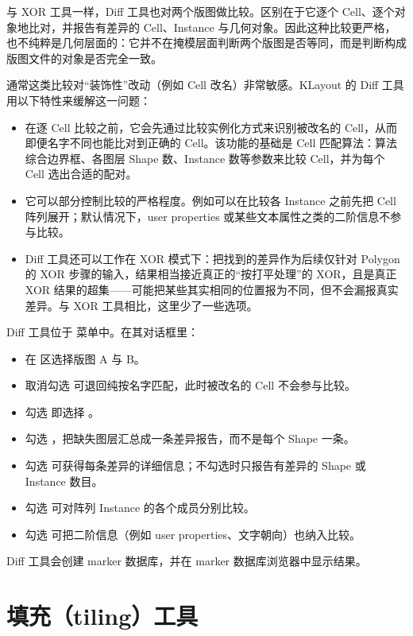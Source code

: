 与 XOR 工具一样，Diff 工具也对两个版图做比较。区别在于它逐个 Cell、逐个对象地比对，并报告有差异的 Cell、Instance 与几何对象。因此这种比较更严格，也不纯粹是几何层面的：它并不在掩模层面判断两个版图是否等同，而是判断构成版图文件的对象是否完全一致。

通常这类比较对“装饰性”改动（例如 Cell 改名）非常敏感。KLayout 的 Diff 工具用以下特性来缓解这一问题：

\begin{itemize}
\item 在逐 Cell 比较之前，它会先通过比较实例化方式来识别被改名的 Cell，从而即便名字不同也能比对到正确的 Cell。该功能的基础是 Cell 匹配算法：算法综合边界框、各图层 Shape 数、Instance 数等参数来比较 Cell，并为每个 Cell 选出合适的配对。
\item 它可以部分控制比较的严格程度。例如可以在比较各 Instance 之前先把 Cell 阵列展开；默认情况下，user properties 或某些文本属性之类的二阶信息不参与比较。
\item Diff 工具还可以工作在 XOR 模式下：把找到的差异作为后续仅针对 Polygon 的 XOR 步骤的输入，结果相当接近真正的“按打平处理”的 XOR，且是真正 XOR 结果的超集——可能把某些其实相同的位置报为不同，但不会漏报真实差异。与 XOR 工具相比，这里少了一些选项。
\end{itemize}

Diff 工具位于  菜单中。在其对话框里：

\begin{itemize}
\item 在  区选择版图 A 与 B。
\item 取消勾选  可退回纯按名字匹配，此时被改名的 Cell 不会参与比较。
\item 勾选  即选择 。
\item 勾选 ，把缺失图层汇总成一条差异报告，而不是每个 Shape 一条。
\item 勾选  可获得每条差异的详细信息；不勾选时只报告有差异的 Shape 或 Instance 数目。
\item 勾选  可对阵列 Instance 的各个成员分别比较。
\item 勾选  可把二阶信息（例如 user properties、文字朝向）也纳入比较。
\end{itemize}

Diff 工具会创建 marker 数据库，并在 marker 数据库浏览器中显示结果。

\section{填充（tiling）工具}\label{sec:tiling}

